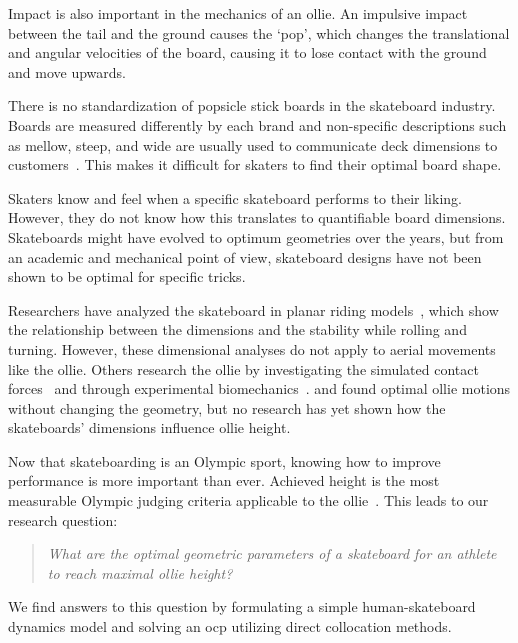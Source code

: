 \documentclass[default,iicol,pdflatex]{sn-jnl}
\begin{document}
Impact is also important in the mechanics of an ollie.
An impulsive impact between the tail and the ground causes the `pop', which changes the translational and angular velocities of the board, causing it to lose contact with the ground and move upwards.

There is no standardization of popsicle stick boards in the skateboard industry.
Boards are measured differently by each brand and non-specific descriptions such as mellow, steep, and wide are usually used to communicate deck dimensions to customers~\cite{berger_handmade_2021}.
This makes it difficult for skaters to find their optimal board shape.

Skaters know and feel when a specific skateboard performs to their liking.
However, they do not know how this translates to quantifiable board dimensions.
Skateboards might have evolved to optimum geometries over the years, but from an academic and mechanical point of view, skateboard designs have not been shown to be optimal for specific tricks.

Researchers have analyzed the skateboard in planar riding models~\cite{hubbard_lateral_1979,kremnev_nonlinear_2010,varszegi_stability_2017}, which show the relationship between the dimensions and the stability while rolling and turning. 
However, these dimensional analyses do not apply to aerial movements like the ollie.
Others research the ollie by investigating the simulated contact forces~\cite{anderson_ollie_2020,shield_contact-implicit_2022} and through experimental biomechanics~\cite{frederick_biomechanics_2006,vorlicek_analysis_2015,wood_3d_2020,candotti_lower_2012,dias_using_2016}.
\citet{shield_contact-implicit_2022} and \citet{anderson_ollie_2020} found optimal ollie motions without changing the geometry, but no research has yet shown how the skateboards' dimensions influence ollie height.

Now that skateboarding is an Olympic sport, knowing how to improve performance is more important than ever.
Achieved height is the most measurable Olympic judging criteria applicable to the ollie~\cite{world_skate_skateboarding_2021}.
This leads to our research question:
\begin{quote}
\textit{
    What are the optimal geometric parameters of a skateboard for an athlete to reach maximal ollie height?}
\end{quote}
We find answers to this question by formulating a simple human-skateboard dynamics model and solving an \gls{ocp} utilizing direct collocation methods.
\end{document}

